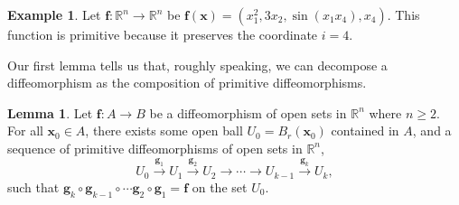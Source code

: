 \documentclass{article}
\newcommand{\R}{\mathbb{R}}
\newcommand{\x}{\mathbf{x}}
\newcommand{\f}{\mathbf{f}}
\theoremstyle{definition}
\newtheorem{lemma}{Lemma}[section]
\newtheorem{example}{Example}[section]
\begin{document}
\begin{example}
	Let $\f:\R^n\to \R^n$ be $\f(\x) = (x_1^2, 3x_2, \sin (x_1x_4), x_4)$. This function is primitive because it preserves the coordinate $i=4$.
\end{example}

Our first lemma tells us that, roughly speaking, we can decompose a diffeomorphism as the composition of primitive diffeomorphisms. 

\begin{lemma}
	Let $\f:A\to B$ be a diffeomorphism of open sets in $\R^n$ where $n\ge 2$. For all $\x_0 \in A$, there exists some open ball $U_0 = B_r(\x_0)$ contained in $A$, and a sequence of primitive diffeomorphisms of open sets in $\R^n$, $$U_0 \overset{\mathbf g_1}{\longrightarrow}U_1\overset{\mathbf g_2}{\longrightarrow} U_2 \longrightarrow \cdots \longrightarrow U_{k-1}  \overset{\mathbf g_k}{\longrightarrow}U_k ,$$ such that $\mathbf g_k\circ \mathbf g_{k-1}\circ \cdots \mathbf g_2\circ \mathbf g_1 = \mathbf f$ on the set $U_0$.
\end{lemma}
\end{document}
